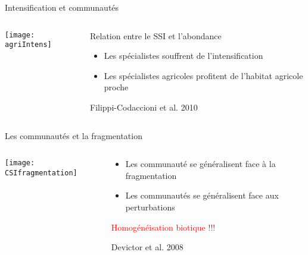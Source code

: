 \documentclass[10pt]{beamer}
\begin{document}
\begin{frame}{Intensification et communautés}
 \begin{columns}[c]
    \begin{column}[c]{0.45\textwidth}
      \begin{center}
          \texttt{[image: agriIntens]}
      \end{center}
    \end{column}
    \begin{column}[c]{0.55\textwidth}
     Relation entre le SSI et l'abondance
      \begin{itemize}[<+->]
      \item <2-> Les spécialistes souffrent de l'intensification
      \item <3> Les spécialistes agricoles profitent de l'habitat agricole proche
      \end{itemize}
        \begin{tiny}
     Filippi-Codaccioni et al. 2010
  \end{tiny}
    \end{column}
  \end{columns}
\end{frame}


\begin{frame}{Les communautés et la fragmentation}
 \begin{columns}[c]
    \begin{column}[c]{0.4\textwidth}
      \begin{center}
     \texttt{[image: CSIfragmentation]}
      \end{center}
    \end{column}
    \begin{column}[c]{0.6\textwidth}
      \begin{itemize}[<+->]
      \item Les communauté se généralisent face à la fragmentation
      \item Les communautés se généralisent face aux perturbations
      \end{itemize}
       \begin{center}
   \textcolor{red}{Homogénéisation biotique !!!}
      \end{center}
        \begin{tiny}
    Devictor et al. 2008
  \end{tiny}
    \end{column}
  \end{columns}
\end{frame}
\end{document}
